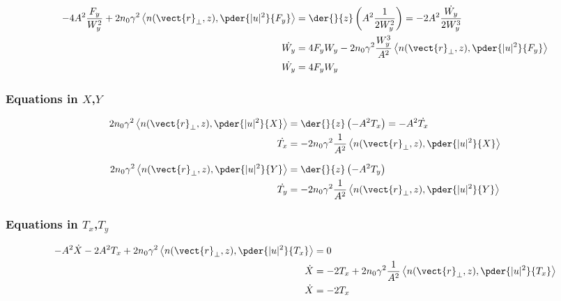 \begin{equation}
\begin{split}
  - 4 A^2 \frac{F_{y}}{W_{y}^2} + 2n_0 \gamma^2 \left<n(\vect{r}_{\perp},z),\pder{|u|^2}{F_y}\right>
    &= \der{}{z}\left(A^2 \frac{1}{2W_{y}^2} \right) = -2 A^2 \frac{\dot{W_{y}}}{2W_{y}^3} \\
   \dot{W_{y}} &= 4 F_{y}W_{y} - 2n_0 \gamma^2 \frac{W_{y}^3}{A^2} \left<n(\vect{r}_{\perp},z),\pder{|u|^2}{F_y}\right> \\
      \dot{W_{y}} &= 4 F_{y}W_{y}
\end{split}
\end{equation}


\subsubsection{Equations in $X$,$Y$}

\begin{equation}
\begin{split}
    2n_0 \gamma^2 \left<n(\vect{r}_{\perp},z), \pder{|u|^2}{X}\right> &= \der{}{z}\left(-A^2 T_x \right) =  -A^2 \dot{T_x}\\
        \dot{T_x} &= - 2n_0 \gamma^2 \frac{1}{A^2} \left<n(\vect{r}_{\perp},z), \pder{|u|^2}{X}\right> 
\end{split}
\end{equation}

\begin{equation}
\begin{split}
   2n_0 \gamma^2 \left<n(\vect{r}_{\perp},z), \pder{|u|^2}{Y}\right> &= \der{}{z}\left(-A^2 T_y \right) \\
        \dot{T_y} &= - 2n_0 \gamma^2 \frac{1}{A^2} \left<n(\vect{r}_{\perp},z), \pder{|u|^2}{Y}\right> 
\end{split}
\end{equation}

\subsubsection{Equations in $T_x$,$T_y$}

\begin{equation}
\begin{split}
   -A^2 \dot{X} - 2A^2 T_x  + 2n_0 \gamma^2 \left<n(\vect{r}_{\perp},z), \pder{|u|^2}{T_{x}}\right> &= 0\\
   \dot{X} &= - 2T_x  + 2n_0 \gamma^2 \frac{1}{A^2} \left<n(\vect{r}_{\perp},z), \pder{|u|^2}{T_{x}}\right>\\
   \dot{X} &= - 2T_x 
\end{split}
\end{equation}

